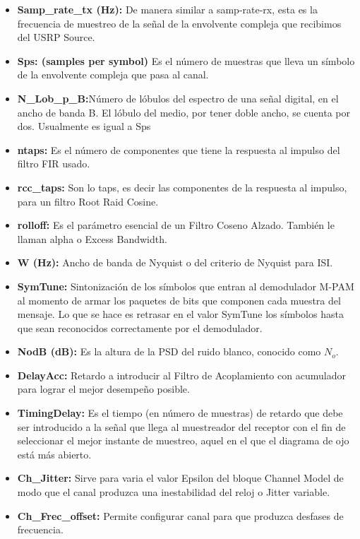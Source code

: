 \begin{itemize}
	\item  \textbf{Samp\_rate\_tx (Hz):} De manera similar a samp-rate-rx, esta es la frecuencia de muestreo de la señal de la envolvente compleja  que recibimos del USRP Source.
	\item  \textbf{Sps: (samples per symbol)}  Es el número de muestras que lleva un símbolo de la envolvente compleja que pasa al canal.
	\item  \textbf{N\_Lob\_p\_B:}Número de lóbulos del espectro de una señal digital, en el ancho de banda B. El lóbulo del medio, por tener doble ancho, se cuenta por dos. Usualmente es igual a Sps
	\item  \textbf{ntaps:} Es el número de componentes que tiene la respuesta al impulso del filtro FIR usado.
	\item  \textbf{rcc\_taps:}  Son lo taps, es decir las componentes de la respuesta al impulso, para un filtro Root Raid Cosine.
	\item  \textbf{rolloff:} Es el parámetro esencial de un Filtro Coseno Alzado. También le llaman alpha o Excess Bandwidth. 
	\item  \textbf{W (Hz):} Ancho de banda de Nyquist o del criterio de Nyquist para ISI.
	\item  \textbf{SymTune:}  Sintonización de los símbolos que entran al demodulador M-PAM al momento de armar los paquetes de bits que componen cada muestra del mensaje. Lo que se hace es retrasar en el valor SymTune los símbolos hasta que sean reconocidos correctamente por el demodulador.
	\item   \textbf{NodB (dB):} Es la altura de la PSD del ruido blanco, conocido como $N_o$.
	\item  \textbf{DelayAcc:} Retardo a introducir al Filtro de Acoplamiento con acumulador para lograr el mejor desempeño posible.
	\item  \textbf{TimingDelay:} Es el tiempo (en número de muestras) de retardo que debe ser introducido a la señal que llega al muestreador del receptor con el fin de seleccionar el mejor instante de muestreo, aquel en el que el diagrama de ojo está más abierto.
	\item  \textbf{Ch\_Jitter:} Sirve para varia el valor Epsilon del bloque Channel Model de modo que el canal produzca una inestabilidad del reloj o Jitter variable.
	\item  \textbf{Ch\_Frec\_offset:} Permite configurar canal para que produzca desfases de frecuencia.
\end{itemize}

